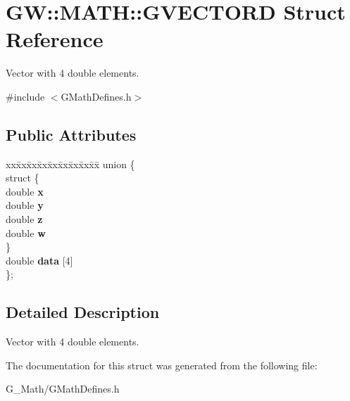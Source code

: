 \hypertarget{struct_g_w_1_1_m_a_t_h_1_1_g_v_e_c_t_o_r_d}{}\section{GW\+:\+:M\+A\+TH\+:\+:G\+V\+E\+C\+T\+O\+RD Struct Reference}
\label{struct_g_w_1_1_m_a_t_h_1_1_g_v_e_c_t_o_r_d}


Vector with 4 double elements.  




{\ttfamily \#include $<$G\+Math\+Defines.\+h$>$}

\subsection*{Public Attributes}
\begin{DoxyCompactItemize}
\item 
\mbox{\label{struct_g_w_1_1_m_a_t_h_1_1_g_v_e_c_t_o_r_d_a16fd4343a1d6a83698bc6bfaa968fd5f}} 
\begin{tabbing}
xx\=xx\=xx\=xx\=xx\=xx\=xx\=xx\=xx\=\kill
union \{\\
\mbox{\label{union_g_w_1_1_m_a_t_h_1_1_g_v_e_c_t_o_r_d_1_1_0D8_a17a8f0ae8f4361d5e49a0b49c723ba55}} 
\>struct \{\\
\>\>double {\bfseries x}\\
\>\>double {\bfseries y}\\
\>\>double {\bfseries z}\\
\>\>double {\bfseries w}\\
\>\} \\
\>double {\bfseries data} \mbox{[}4\mbox{]}\\
\}; \\

\end{tabbing}\end{DoxyCompactItemize}


\subsection{Detailed Description}
Vector with 4 double elements. 

The documentation for this struct was generated from the following file\+:\begin{DoxyCompactItemize}
\item 
G\+\_\+\+Math/G\+Math\+Defines.\+h\end{DoxyCompactItemize}
